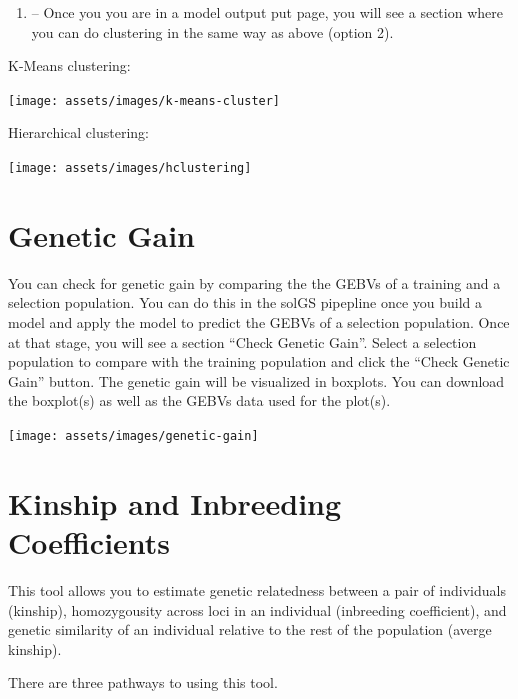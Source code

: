 \documentclass[
  12pt,
]{book}
\providecommand{\tightlist}{%
  \setlength{\itemsep}{0pt}\setlength{\parskip}{0pt}}
\begin{document}
\begin{enumerate}
\def\labelenumi{(\Alph{enumi})}
\tightlist
\item
  -- Once you you are in a model output put page, you will see a section where you can do clustering in the same way as above (option 2).
\end{enumerate}

K-Means clustering:

\begin{center}\texttt{[image: assets/images/k-means-cluster]} \end{center}

Hierarchical clustering:

\begin{center}\texttt{[image: assets/images/hclustering]} \end{center}

\hypertarget{genetic-gain}{%
\section{Genetic Gain}\label{genetic-gain}}

You can check for genetic gain by comparing the the GEBVs of a training and a selection population. You can do this in the solGS pipepline once you build a model and apply the model to predict the GEBVs of a selection population. Once at that stage, you will see a section ``Check Genetic Gain''. Select a selection population to compare with the training population and click the ``Check Genetic Gain'' button. The genetic gain will be visualized in boxplots. You can download the boxplot(s) as well as the GEBVs data used for the plot(s).

\begin{center}\texttt{[image: assets/images/genetic-gain]} \end{center}

\hypertarget{kinship-and-inbreeding-coefficients}{%
\section{Kinship and Inbreeding Coefficients}\label{kinship-and-inbreeding-coefficients}}

This tool allows you to estimate genetic relatedness between a pair of individuals (kinship), homozygousity across loci in an individual (inbreeding coefficient), and genetic similarity of an individual relative to the rest of the population (averge kinship).

There are three pathways to using this tool.
\end{document}
